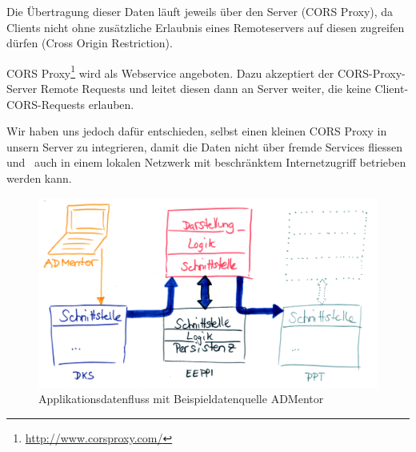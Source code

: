 		Die Übertragung dieser Daten läuft jeweils über den Server (CORS Proxy), 
		da Clients nicht ohne zusätzliche Erlaubnis eines Remoteservers
		auf diesen zugreifen dürfen (Cross Origin Restriction).
		
		CORS Proxy\footnote{\url{http://www.corsproxy.com/}} wird als Webservice angeboten.
		Dazu akzeptiert der CORS-Proxy-Server Remote Requests und leitet diesen dann
		an Server weiter, die keine Client-CORS-Requests erlauben.
		
		Wir haben uns jedoch dafür entschieden, selbst einen kleinen CORS Proxy
		in unsern Server zu integrieren, damit die Daten nicht über 
		fremde Services fliessen und \eeppi\ auch in einem lokalen Netzwerk
		mit beschränktem Internetzugriff betrieben werden kann.
		
		\begin{figure}[H]
			\includegraphics[width=\textwidth]{architecture/media/img/eeppiDataflow.jpg}
			\centering
			\caption{Applikationsdatenfluss mit Beispieldatenquelle ADMentor}
			\label{fig:applicationDataFlow}
		\end{figure}		